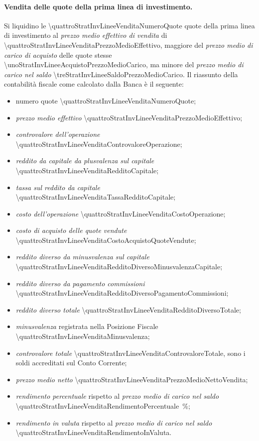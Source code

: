 \documentclass[12pt,a4paper]{article}
\newcommand{\Eur}[1]{\SI{#1}{\text{\euro{}}}}
\begin{document}
\paragraph{Vendita delle quote della prima linea di investimento.}
Si   liquidino  le   \num{\quattroStratInvLineeVenditaNumeroQuote}  quote   della  prima   linea  di
investimento       al       \emph{prezzo       medio      effettivo       di       vendita}       di
\Eur{\quattroStratInvLineeVenditaPrezzoMedioEffettivo}, maggiore del \emph{prezzo medio di carico di
   acquisto}  delle quote  stesse  \Eur{\unoStratInvLineeAcquistoPrezzoMedioCarico},  ma minore  del
\emph{prezzo medio di carico nel saldo} \Eur{\treStratInvLineeSaldoPrezzoMedioCarico}.  Il riassunto
della contabilità fiscale come calcolato dalla Banca è il seguente:
\begin{itemize}
\item numero quote \num{\quattroStratInvLineeVenditaNumeroQuote};
\item \emph{prezzo medio effettivo} \Eur{\quattroStratInvLineeVenditaPrezzoMedioEffettivo};
\item \emph{controvalore dell'operazione} \Eur{\quattroStratInvLineeVenditaControvaloreOperazione};
\item \emph{reddito da capitale da plusvalenza sul capitale} \Eur{\quattroStratInvLineeVenditaRedditoCapitale};
\item \emph{tassa sul reddito da capitale} \Eur{\quattroStratInvLineeVenditaTassaRedditoCapitale};
\item \emph{costo dell'operazione} \Eur{\quattroStratInvLineeVenditaCostoOperazione};
\item \emph{costo di acquisto delle quote vendute} \Eur{\quattroStratInvLineeVenditaCostoAcquistoQuoteVendute};
\item \emph{reddito diverso da minusvalenza sul capitale} \Eur{\quattroStratInvLineeVenditaRedditoDiversoMinusvalenzaCapitale};
\item \emph{reddito diverso da pagamento commissioni} \Eur{\quattroStratInvLineeVenditaRedditoDiversoPagamentoCommissioni};
\item \emph{reddito diverso totale} \Eur{\quattroStratInvLineeVenditaRedditoDiversoTotale};
\item \emph{minusvalenza} registrata nella Posizione Fiscale \Eur{\quattroStratInvLineeVenditaMinusvalenza};
\item \emph{controvalore totale}  \Eur{\quattroStratInvLineeVenditaControvaloreTotale}, sono i soldi
  accreditati sul Conto Corrente;
\item \emph{prezzo medio netto} \Eur{\quattroStratInvLineeVenditaPrezzoMedioNettoVendita};
\item  \emph{rendimento   percentuale}  rispetto  al   \emph{prezzo  medio  di  carico   nel  saldo}
  \SI{\quattroStratInvLineeVenditaRendimentoPercentuale}{\percent};
\item  \emph{rendimento   in  valuta}  rispetto   al  \emph{prezzo   medio  di  carico   nel  saldo}
  \Eur{\quattroStratInvLineeVenditaRendimentoInValuta}.
\end{itemize}
\end{document}
